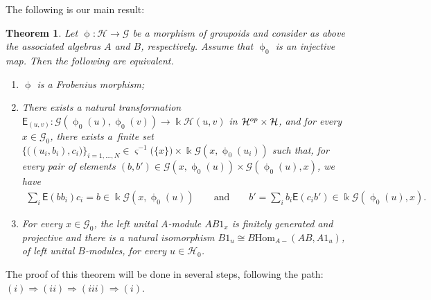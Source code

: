 \documentclass[11pt]{article}
\numberwithin{equation}{section}
\newtheorem{Theorem}{Theorem}[section]
\newcommand{\Sf}[1]{\mathsf{#1}}
\renewcommand{\hom}[3]{\mathrm{Hom}_{\Sscript{#1}}\left(#2, #3\right)}
\newcommand{\Go}{\cG_{\Sscript{0}}}
\newcommand{\Ho}{\cH_{\Sscript{0}}}
\newcommand{\cG}{{\mathcal G}}
\newcommand{\cH}{{\mathcal H}}
\newcommand{\Sscript}[1]{\scriptscriptstyle{#1}}
\newcommand{\phio}{\upphi_{\Sscript{0}}}
\begin{document}
The following is our main result:
\begin{Theorem}\label{thm:FM}Let $\upphi\colon \cH \to \cG$ be a morphism of groupoids and consider as above the associated algebras $A$ and $B$, respectively. Assume that $\upphi_{\Sscript{0}}$ is an injective map. Then the following are equivalent.
\begin{enumerate}[$(i)$]\itemsep=0pt
\item $\upphi$ is a Frobenius morphism;
\item There exists a natural transformation $\Sf{E}_{\Sscript{(u, v)}}\colon \cG(\phio(u),\phio(v)) \longrightarrow \Bbbk \cH(u,v)$ in $\cH^{\rm op} \times \cH$, and for every $x \in \Go$, there exists a~finite set
$\{\big((u_{i},b_{i}), c_{i}\big)\}_{i=1, \dots, N} \in \varsigma^{-1}\big( \{x\}\big)\times \Bbbk \cG(x, \phio(u_{i}))$ such that, for every pair of elements $ (b, b') \in \cG(x, \phio(u)) \times \cG(\phio(u), x)$, we have
\begin{gather*}
\sum_{i}\Sf{E}(bb_{i})c_{i} = b \in \Bbbk \cG(x, \phio(u)) \qquad \text{and} \qquad b' = \sum_{i}b_{i}\Sf{E}(c_{i}b') \in \Bbbk \cG(\phio(u), x).
\end{gather*}
\item For every $x\in \Go$, the left unital $A$-module $AB1_{x}$ is finitely generated and projective and there is a natural isomorphism $B1_{u} \cong B\hom{A-}{AB}{A1_{u}}$, of left unital $B$-modules, for every $u\in \Ho$.
\end{enumerate}
\end{Theorem}

The proof of this theorem will be done in several steps, following the path: $(i) \Rightarrow (ii) \Rightarrow (iii) \Rightarrow (i)$.
\end{document}
